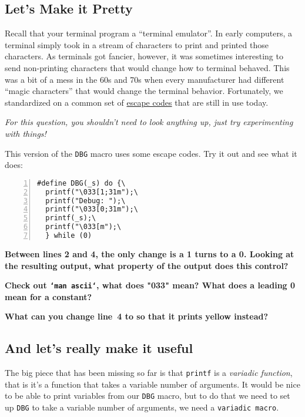 \documentclass{article}
\begin{document}
\newpage

\subsection{Let's Make it Pretty}

Recall that your terminal program a ``terminal emulator''. In early computers,
a terminal simply took in a stream of characters to print and printed those
characters. As terminals got fancier, however, it was sometimes interesting to
send non-printing characters that would change how to terminal behaved. This
was a bit of a mess in the 60s and 70s when every manufacturer had different
``magic characters'' that would change the terminal behavior. Fortunately, we
standardized on a common set of
\href{https://en.wikipedia.org/wiki/ANSI_escape_code}{escape codes} that are
still in use today.

\emph{For this question, you shouldn't need to look anything up, just try
  experimenting with things!}

This version of the \texttt{DBG} macro uses some escape codes. Try it out and
see what it does:

\begin{lstlisting}[numbers=left]
#define DBG(_s) do {\
  printf("\033[1;31m");\
  printf("Debug: ");\
  printf("\033[0;31m");\
  printf(_s);\
  printf("\033[m");\
  } while (0)
\end{lstlisting}

\textbf{Between lines 2 and 4, the only change is a 1 turns to a 0.
  Looking at the resulting output, what property of the output does this control?}
\vspace{2cm}

\textbf{Check out \texttt{`man ascii`}, what does "033" mean?
  What does a leading 0 mean for a constant?}
\vspace{2cm}

\textbf{What can you change line~4 to so that it prints yellow instead?}



\newpage
\subsection{And let's really make it useful}

The big piece that has been missing so far is that \texttt{printf} is a
\emph{variadic function}, that is it's a function that takes a variable
number of arguments. It would be nice to be able to print variables from our
\texttt{DBG} macro, but to do that we need to set up \texttt{DBG} to take a
variable number of arguments, we need a \texttt{variadic macro}.
\end{document}
